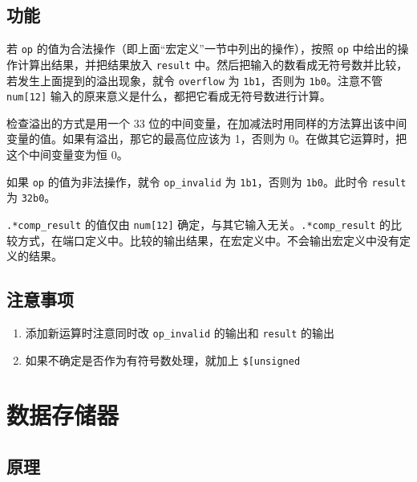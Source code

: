 \documentclass[12pt,AutoFakeBold]{article}
\providecommand{\tightlist}{%
  \setlength{\itemsep}{0pt}\setlength{\parskip}{0pt}}
\begin{document}
\hypertarget{ux529fux80fd-7}{%
\subsection{功能}\label{ux529fux80fd-7}}

若 \texttt{op} 的值为合法操作（即上面``宏定义''一节中列出的操作），按照
\texttt{op} 中给出的操作计算出结果，并把结果放入 \texttt{result}
中。然后把输入的数看成无符号数并比较，若发生上面提到的溢出现象，就令
\texttt{overflow} 为 \texttt{1\textquotesingle{}b1}，否则为
\texttt{1\textquotesingle{}b0}。注意不管 \texttt{num{[}12{]}}
输入的原来意义是什么，都把它看成无符号数进行计算。

检查溢出的方式是用一个 33
位的中间变量，在加减法时用同样的方法算出该中间变量的值。如果有溢出，那它的最高位应该为
1，否则为 0。在做其它运算时，把这个中间变量变为恒 0。

如果 \texttt{op} 的值为非法操作，就令 \texttt{op\_invalid} 为
\texttt{1\textquotesingle{}b1}，否则为
\texttt{1\textquotesingle{}b0}。此时令 \texttt{result} 为
\texttt{32\textquotesingle{}b0}。

\texttt{.*comp\_result} 的值仅由 \texttt{num{[}12{]}}
确定，与其它输入无关。\texttt{.*comp\_result}
的比较方式，在端口定义中。比较的输出结果，在宏定义中。不会输出宏定义中没有定义的结果。

\hypertarget{ux6ce8ux610fux4e8bux9879-4}{%
\subsection{注意事项}\label{ux6ce8ux610fux4e8bux9879-4}}

\begin{enumerate}
\def\labelenumi{\arabic{enumi}.}
\tightlist
\item
  添加新运算时注意同时改 \texttt{op\_invalid} 的输出和 \texttt{result}
  的输出
\item
  如果不确定是否作为有符号数处理，就加上 \texttt{{\${}[}un\textbar{}{]}signed}
\end{enumerate}

\hypertarget{ux6570ux636eux5b58ux50a8ux5668}{%
\section{数据存储器}\label{ux6570ux636eux5b58ux50a8ux5668}}

\hypertarget{ux539fux7406-4}{%
\subsection{原理}\label{ux539fux7406-4}}
\end{document}

